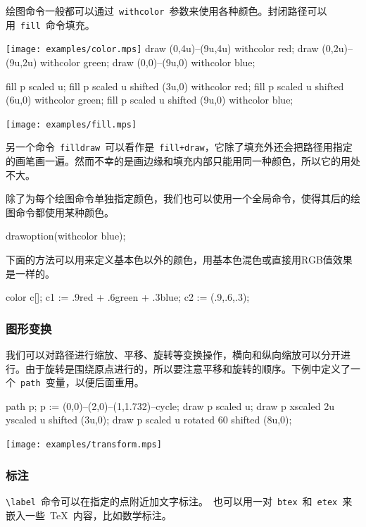 绘图命令一般都可以通过~\verb|withcolor|~参数来使用各种颜色。封闭路径可以用~\verb|fill|~命令填充。

\begin{fdemo}{\texttt{[image: examples/color.mps]}}
draw (0,4u)--(9u,4u) withcolor red;
draw (0,2u)--(9u,2u) withcolor green;
draw (0,0)--(9u,0) withcolor blue;
\end{fdemo}

\begin{code}
fill p scaled u;
fill p scaled u shifted (3u,0) withcolor red;
fill p scaled u shifted (6u,0) withcolor green;
fill p scaled u shifted (9u,0) withcolor blue;
\end{code}

\begin{out}
\texttt{[image: examples/fill.mps]}
\end{out}

另一个命令~\verb|filldraw|~可以看作是~\verb|fill+draw|，它除了填充外还会把路径用指定的画笔画一遍。然而不幸的是画边缘和填充内部只能用同一种颜色，所以它的用处不大。

除了为每个绘图命令单独指定颜色，我们也可以使用一个全局命令，使得其后的绘图命令都使用某种颜色。
\begin{code}
drawoption(withcolor blue);
\end{code}

下面的方法可以用来定义基本色以外的颜色，用基本色混色或直接用RGB值效果是一样的。

\begin{code}
color c[];
c1 := .9red + .6green + .3blue;
c2 := (.9,.6,.3);
\end{code}

\subsubsection{图形变换}
我们可以对路径进行缩放、平移、旋转等变换操作，横向和纵向缩放可以分开进行。由于旋转是围绕原点进行的，所以要注意平移和旋转的顺序。下例中定义了一个~\verb|path|~变量，以便后面重用。

\begin{code}
path p;
p := (0,0)--(2,0)--(1,1.732)--cycle;
draw p scaled u;
draw p xscaled 2u yscaled u shifted (3u,0);
draw p scaled u rotated 60 shifted (8u,0);
\end{code}

\begin{out}
\texttt{[image: examples/transform.mps]}
\end{out}

\subsubsection{标注}
\verb|\label|~命令可以在指定的点附近加文字标注。\MP~也可以用一对~\verb|btex|~和~\verb|etex|~来嵌入一些~\TeX~内容，比如数学标注。

